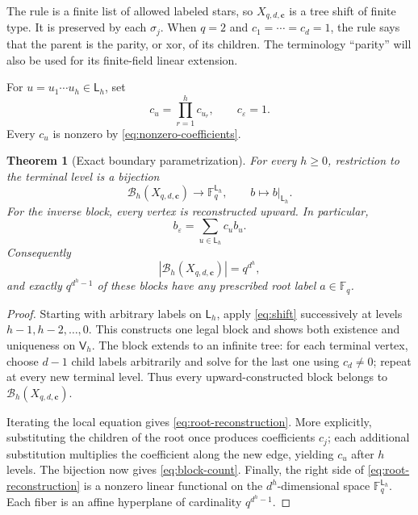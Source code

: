 \documentclass[11pt,a4paper]{amsart}
\newtheorem{theorem}{Theorem}[section]
\theoremstyle{definition}
\theoremstyle{remark}
\newcommand{\F}{\mathbb F}
\newcommand{\cB}{\mathcal B}
\newcommand{\eps}{\varepsilon}
\newcommand{\Lev}{\mathsf L}
\newcommand{\Vol}{\mathsf V}
\begin{document}
The rule is a finite list of allowed labeled stars, so
$X_{q,d,\boldsymbol c}$ is a tree shift of finite type.  It is preserved by
each $\sigma_j$.  When $q=2$ and $c_1=\cdots=c_d=1$, the rule says that the
parent is the parity, or xor, of its children.  The terminology ``parity''
will also be used for its finite-field linear extension.

For $u=u_1\cdots u_h\in\Lev_h$, set
\begin{equation}\label{eq:path-coefficient}
 c_u=\prod_{r=1}^h c_{u_r},
 \qquad c_\eps=1.
\end{equation}
Every $c_u$ is nonzero by \eqref{eq:nonzero-coefficients}.

\begin{theorem}[Exact boundary parametrization]\label{thm:boundary}
For every $h\geq0$, restriction to the terminal level is a bijection
\begin{equation}\label{eq:boundary-bijection}
 \cB_h(X_{q,d,\boldsymbol c})\longrightarrow\F_q^{\Lev_h},
 \qquad b\longmapsto b|_{\Lev_h}.
\end{equation}
For the inverse block, every vertex is reconstructed upward.  In particular,
\begin{equation}\label{eq:root-reconstruction}
 b_\eps=\sum_{u\in\Lev_h}c_ub_u.
\end{equation}
Consequently
\begin{equation}\label{eq:block-count}
 |\cB_h(X_{q,d,\boldsymbol c})|=q^{d^h},
\end{equation}
and exactly $q^{d^h-1}$ of these blocks have any prescribed root label
$a\in\F_q$.
\end{theorem}

\begin{proof}
Starting with arbitrary labels on $\Lev_h$, apply
\eqref{eq:shift} successively at levels $h-1,h-2,\ldots,0$.  This constructs
one legal block and shows both existence and uniqueness on $\Vol_h$.
The block extends to an infinite tree: for each terminal vertex, choose
$d-1$ child labels arbitrarily and solve for the last one using
$c_d\ne0$; repeat at every new terminal level.  Thus every upward-constructed
block belongs to $\cB_h(X_{q,d,\boldsymbol c})$.

Iterating the local equation gives \eqref{eq:root-reconstruction}.  More
explicitly, substituting the children of the root once produces coefficients
$c_j$; each additional substitution multiplies the coefficient along the
new edge, yielding $c_u$ after $h$ levels.  The bijection now gives
\eqref{eq:block-count}.  Finally, the right side of
\eqref{eq:root-reconstruction} is a nonzero linear functional on the
$d^h$-dimensional space $\F_q^{\Lev_h}$.  Each fiber is an affine hyperplane
of cardinality $q^{d^h-1}$.
\end{proof}
\end{document}
